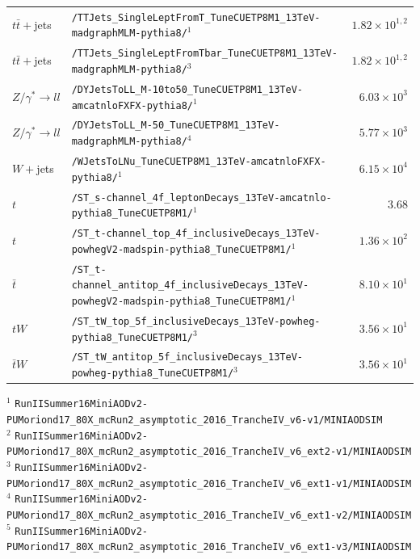 \begin{landscape}
\begin{longtable}{lp{6.0in}r}
$t\bar{t}+$jets & \texttt{/TTJets\_SingleLeptFromT\_TuneCUETP8M1\_13TeV-madgraphMLM-pythia8/}$^{1}$ & $1.82 \times 10^{1,2}$ \\
$t\bar{t}+$jets & \texttt{/TTJets\_SingleLeptFromTbar\_TuneCUETP8M1\_13TeV-madgraphMLM-pythia8/}$^{3}$ & $1.82 \times 10^{1,2}$ \\
$Z/\gamma^{*}\rightarrow ll$ & \texttt{/DYJetsToLL\_M-10to50\_TuneCUETP8M1\_13TeV-amcatnloFXFX-pythia8/}$^{1}$ & $6.03 \times 10^{3}$ \\
$Z/\gamma^{*}\rightarrow ll$ & \texttt{/DYJetsToLL\_M-50\_TuneCUETP8M1\_13TeV-madgraphMLM-pythia8/}$^{4}$ & $5.77 \times 10^{3}$ \\
$W+$jets & \texttt{/WJetsToLNu\_TuneCUETP8M1\_13TeV-amcatnloFXFX-pythia8/}$^{1}$ & $6.15 \times 10^{4}$ \\
$t$ & \texttt{/ST\_s-channel\_4f\_leptonDecays\_13TeV-amcatnlo-pythia8\_TuneCUETP8M1/}$^{1}$ & $3.68$ \\
$t$ & \texttt{/ST\_t-channel\_top\_4f\_inclusiveDecays\_13TeV-powhegV2-madspin-pythia8\_TuneCUETP8M1/}$^{1}$ & $1.36 \times 10^{2}$ \\
$\bar{t}$ & \texttt{/ST\_t-channel\_antitop\_4f\_inclusiveDecays\_13TeV-powhegV2-madspin-pythia8\_TuneCUETP8M1/}$^{1}$ & $8.10 \times 10^{1}$ \\
$tW$ & \texttt{/ST\_tW\_top\_5f\_inclusiveDecays\_13TeV-powheg-pythia8\_TuneCUETP8M1/}$^{3}$ & $3.56 \times 10^{1}$ \\
$\bar{t}W$ & \texttt{/ST\_tW\_antitop\_5f\_inclusiveDecays\_13TeV-powheg-pythia8\_TuneCUETP8M1/}$^{3}$ & $3.56 \times 10^{1}$ \\

\end{longtable}
{\footnotesize
$^{1}$ \texttt{RunIISummer16MiniAODv2-PUMoriond17\_80X\_mcRun2\_asymptotic\_2016\_TrancheIV\_v6-v1/MINIAODSIM} \\
$^{2}$ \texttt{RunIISummer16MiniAODv2-PUMoriond17\_80X\_mcRun2\_asymptotic\_2016\_TrancheIV\_v6\_ext2-v1/MINIAODSIM} \\
$^{3}$ \texttt{RunIISummer16MiniAODv2-PUMoriond17\_80X\_mcRun2\_asymptotic\_2016\_TrancheIV\_v6\_ext1-v1/MINIAODSIM} \\
$^{4}$ \texttt{RunIISummer16MiniAODv2-PUMoriond17\_80X\_mcRun2\_asymptotic\_2016\_TrancheIV\_v6\_ext1-v2/MINIAODSIM} \\
$^{5}$ \texttt{RunIISummer16MiniAODv2-PUMoriond17\_80X\_mcRun2\_asymptotic\_2016\_TrancheIV\_v6\_ext1-v3/MINIAODSIM} \\
} %

\end{landscape}


